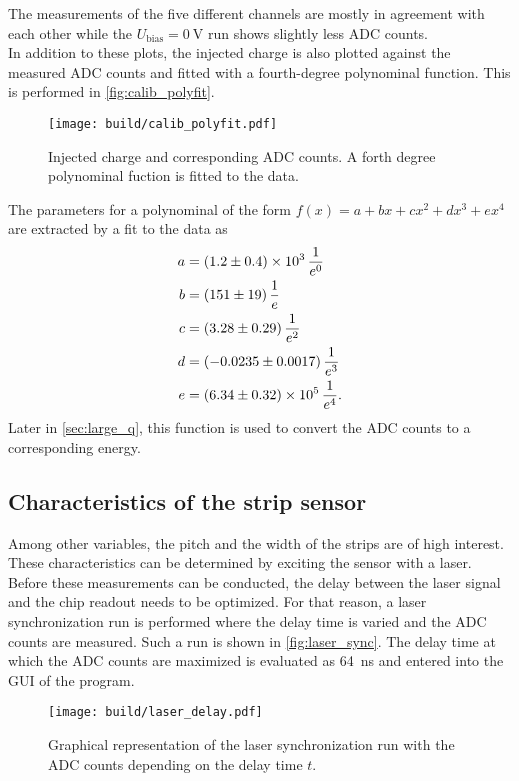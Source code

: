 The measurements of the five different channels are mostly in agreement with each other while the $U_{\mathrm{bias}}=\qty{0}{\volt}$ run shows slightly
less ADC counts. \\
In addition to these plots, the injected charge is also plotted against the measured ADC counts and fitted with a fourth-degree polynominal 
function. This is performed in \autoref{fig:calib_polyfit}. 
\begin{figure}
    \centering
    \texttt{[image: build/calib\_polyfit.pdf]}
    \caption{Injected charge and corresponding ADC counts. A forth degree polynominal fuction is fitted to the data.}
    \label{fig:calib_polyfit}
\end{figure}
The parameters for
a polynominal of the form $f(x) = a + bx + cx^2 + dx^3 + ex^4$ are extracted by a fit to the data as
\begin{align*}
    a &= \qty{1.2(0.4)e3}{\per\raiseto{0}\elementarycharge} \\
    b &= \qty{151+-19}{\per\raiseto{1}\elementarycharge} \\
    c &= \qty{3.28+-0.29}{\per\raiseto{2}\elementarycharge} \\
    d &= \qty{-0.0235+-0.0017}{\per\raiseto{3}\elementarycharge} \\
    e &= \qty{6.34(0.32)e5}{\per\raiseto{4}\elementarycharge}. \\
\end{align*} 
Later in \autoref{sec:large_q}, this function is used to convert the ADC counts to a corresponding energy.

\subsection{Characteristics of the strip sensor}
\label{sec:characteristics_strip_sensor}
Among other variables, the pitch and the width of the strips are of high interest. These characteristics can be determined by exciting the sensor with a laser.
Before these measurements can be conducted, the delay between the laser signal and the chip readout needs to be optimized. For that reason, a laser synchronization
run is performed where the delay time is varied and the ADC counts are measured. Such a run is shown in \autoref{fig:laser_sync}. The delay time at which the ADC
counts are maximized is evaluated as \qty{64}{\nano\second} and entered into the GUI of the program.
\begin{figure}
    \centering
    \texttt{[image: build/laser\_delay.pdf]}
    \caption{Graphical representation of the laser synchronization run with the ADC counts depending on the delay time $t$.}
    \label{fig:laser_sync}
\end{figure}

